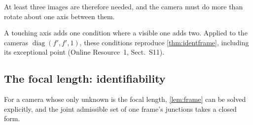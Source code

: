 \documentclass[pdflatex,sn-mathphys-num,iicol]{sn-jnl}
\newcommand{\OR}{Online Resource~1}
\theoremstyle{thmstyleone}
\theoremstyle{thmstylethree}
\theoremstyle{thmstyletwo}
\begin{document}
At least three images are therefore needed, and the camera must do more than rotate about one axis between them.





A touching axis adds one condition where a visible one adds two. Applied to the cameras $\operatorname{diag}(f',f',1)$, these conditions reproduce \cref{thm:identframe}, including its exceptional point (\OR, Sect.~S11).

\subsection{The focal length: identifiability}\label{sec:identifiability}

For a camera whose only unknown is the focal length, \cref{lem:frame} can be solved explicitly, and the joint admissible set of one frame's junctions takes a closed form.
\end{document}
